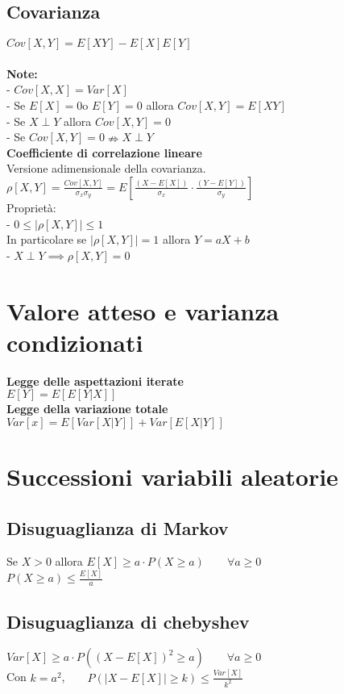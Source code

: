 \documentclass{article}
\begin{document}
\begin{multicols*}{3}
		\subsection{Covarianza}
		\(Cov[X,Y] = E[XY] -E[X]E[Y]\)\\\\
		\textbf{Note:}\\
		- \(Cov[X,X] = Var[X]\)\\
		- Se \(E[X] = 0 \)o \(E[Y] = 0\) allora \(Cov[X,Y] = E[XY]\)\\
		- Se \(X\perp Y\) allora \(Cov[X,Y] =0\)\\
		- Se \(Cov[X,Y] = 0 \nRightarrow X\perp Y\)\\ 
		\textbf{Coefficiente di correlazione lineare}\\
		Versione adimensionale della covarianza.\\
		\(\rho[X,Y] = \frac{Cov[X,Y]}{\sigma_x\sigma_y}= E[\frac{(X-E[X])}{\sigma_x}\cdot \frac{(Y-E[Y])}{\sigma_y}]\)\\
		Proprietà:\\
		- \(0\leq|\rho[X,Y]| \leq 1\)\\
		In particolare se \(|\rho[X,Y]| = 1\) allora \(Y=aX+b\)\\
		- \(X\perp Y \implies\rho[X,Y] = 0 \)
		\section{Valore atteso e varianza condizionati}
		\textbf{Legge delle aspettazioni iterate}\\
		\(E[Y] = E[E[Y|X]]\)\\
		\textbf{Legge della variazione totale}\\
		\(Var[x] = E[Var[X|Y]] + Var[E[X|Y]] \)\\
		\section{Successioni variabili aleatorie}
		\subsection{Disuguaglianza di Markov}
		Se \(X > 0\) allora \(E[X] \geq a \cdot P(X\geq a) \qquad \forall a\geq 0\)\\
		\(P(X\geq a) \leq \frac{E[X]}{a}\)\\
		\subsection{Disuguaglianza di chebyshev}
		\(Var[X] \geq a \cdot P((X-E[X])^2 \geq a) \qquad \forall a\geq 0\)\\
		Con \(k= a^2\),\(\qquad P(|X-E[X]|\geq k) \leq \frac{Var[X]}{k^2}\)\\

\end{multicols*}
\end{document}
